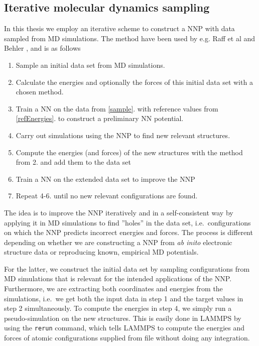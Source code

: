 \documentclass[twoside,english]{uiofysmaster}
\begin{document}
\subsection{Iterative molecular dynamics sampling} \label{sec:iterativeMDsampling}
In this thesis we employ an iterative scheme to construct a NNP with data sampled from MD simulations. 
The method have been used by e.g. Raff et al \cite{Raff12} and Behler \cite{Behler11general}, and is as follows
\begin{enumerate}
 \item Sample an initial data set from MD simulations. \label{sample} 
 \item Calculate the energies and optionally the forces of this initial data set with a chosen method. \label{refEnergies}
 \item Train a NN on the data from \ref{sample}. with reference values from \ref{refEnergies}. to
 construct a preliminary NN potential.
 \item Carry out simulations using the NNP to find new relevant structures. 
 \item Compute the energies (and forces) of the new structures with the method from 2. and add them to the data set
 \item Train a NN on the extended data set to improve the NNP
 \item Repeat 4-6. until no new relevant configurations are found. 
  \label{NNPalgorithm}
\end{enumerate}
The idea is to improve the NNP iteratively and in a self-consistent 
way by applying it in MD simulations to find 
''holes'' in the data set, i.e.\ configurations on which the NNP predicts incorrect energies and forces. The process
is different depending on whether we are constructing a NNP from \textit{ab inito} electronic structure data
or reproducing known, empirical MD potentials. 

For the latter, we construct the initial data set by sampling configurations from MD simulations that is relevant
for the intended applications of the NNP. Furthermore, we are extracting both coordinates and energies from the simulations, i.e.\
we get both the input data in step 1 and the target values in step 2 simultaneously. To compute the energies in
step 4, we simply run a pseudo-simulation on the new structures. This is easily done in LAMMPS by using 
the \texttt{rerun} command, which tells LAMMPS to compute the energies and forces of atomic configurations 
supplied from file without doing any integration. 
\end{document}
